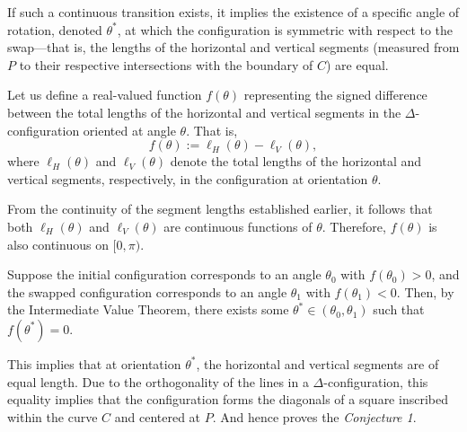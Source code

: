 If such a continuous transition exists, it implies the existence of a specific angle of rotation, denoted $\theta^*$, at which the configuration is symmetric with respect to the swap—that is, the lengths of the horizontal and vertical segments (measured from $P$ to their respective intersections with the boundary of $C$) are equal.

Let us define a real-valued function $f(\theta)$ representing the signed difference between the total lengths of the horizontal and vertical segments in the $\Delta$-configuration oriented at angle $\theta$. That is,
\[
f(\theta) := \ell_H(\theta) - \ell_V(\theta),
\]
where $\ell_H(\theta)$ and $\ell_V(\theta)$ denote the total lengths of the horizontal and vertical segments, respectively, in the configuration at orientation $\theta$.

From the continuity of the segment lengths established earlier, it follows that both $\ell_H(\theta)$ and $\ell_V(\theta)$ are continuous functions of $\theta$. Therefore, $f(\theta)$ is also continuous on $[0, \pi)$.

Suppose the initial configuration corresponds to an angle $\theta_0$ with $f(\theta_0) > 0$, and the swapped configuration corresponds to an angle $\theta_1$ with $f(\theta_1) < 0$. Then, by the Intermediate Value Theorem, there exists some $\theta^* \in (\theta_0, \theta_1)$ such that $f(\theta^*) = 0$.

This implies that at orientation $\theta^*$, the horizontal and vertical segments are of equal length. Due to the orthogonality of the lines in a $\Delta$-configuration, this equality implies that the configuration forms the diagonals of a square inscribed within the curve $C$ and centered at $P$. And hence proves the \emph{Conjecture 1}.